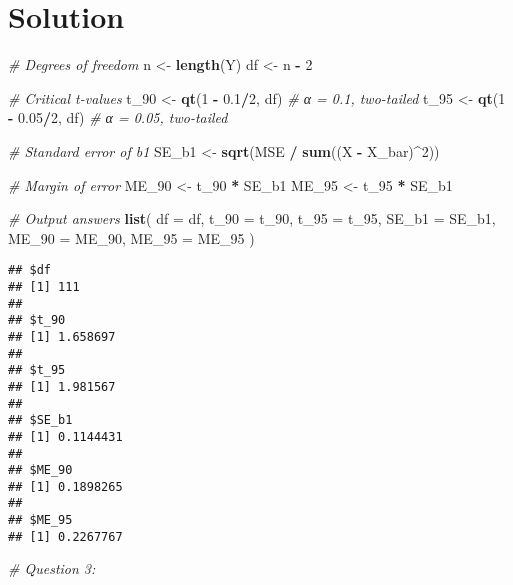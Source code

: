\documentclass[
]{article}
\newenvironment{Shaded}{\begin{snugshade}}{\end{snugshade}}
\newcommand{\AttributeTok}[1]{\textcolor[rgb]{0.13,0.29,0.53}{#1}}
\newcommand{\CommentTok}[1]{\textcolor[rgb]{0.56,0.35,0.01}{\textit{#1}}}
\newcommand{\DecValTok}[1]{\textcolor[rgb]{0.00,0.00,0.81}{#1}}
\newcommand{\FloatTok}[1]{\textcolor[rgb]{0.00,0.00,0.81}{#1}}
\newcommand{\FunctionTok}[1]{\textcolor[rgb]{0.13,0.29,0.53}{\textbf{#1}}}
\newcommand{\NormalTok}[1]{#1}
\newcommand{\OtherTok}[1]{\textcolor[rgb]{0.56,0.35,0.01}{#1}}
\newcommand{\SpecialCharTok}[1]{\textcolor[rgb]{0.81,0.36,0.00}{\textbf{#1}}}
\begin{document}
\section{Solution}\label{solution}

\begin{Shaded}
\begin{Highlighting}[]
\CommentTok{\# Degrees of freedom}
\NormalTok{n }\OtherTok{\textless{}{-}} \FunctionTok{length}\NormalTok{(Y)}
\NormalTok{df }\OtherTok{\textless{}{-}}\NormalTok{ n }\SpecialCharTok{{-}} \DecValTok{2}

\CommentTok{\# Critical t{-}values}
\NormalTok{t\_90 }\OtherTok{\textless{}{-}} \FunctionTok{qt}\NormalTok{(}\DecValTok{1} \SpecialCharTok{{-}} \FloatTok{0.1}\SpecialCharTok{/}\DecValTok{2}\NormalTok{, df)   }\CommentTok{\# α = 0.1, two{-}tailed}
\NormalTok{t\_95 }\OtherTok{\textless{}{-}} \FunctionTok{qt}\NormalTok{(}\DecValTok{1} \SpecialCharTok{{-}} \FloatTok{0.05}\SpecialCharTok{/}\DecValTok{2}\NormalTok{, df)  }\CommentTok{\# α = 0.05, two{-}tailed}

\CommentTok{\# Standard error of b1}
\NormalTok{SE\_b1 }\OtherTok{\textless{}{-}} \FunctionTok{sqrt}\NormalTok{(MSE }\SpecialCharTok{/} \FunctionTok{sum}\NormalTok{((X }\SpecialCharTok{{-}}\NormalTok{ X\_bar)}\SpecialCharTok{\^{}}\DecValTok{2}\NormalTok{))}

\CommentTok{\# Margin of error}
\NormalTok{ME\_90 }\OtherTok{\textless{}{-}}\NormalTok{ t\_90 }\SpecialCharTok{*}\NormalTok{ SE\_b1}
\NormalTok{ME\_95 }\OtherTok{\textless{}{-}}\NormalTok{ t\_95 }\SpecialCharTok{*}\NormalTok{ SE\_b1}

\CommentTok{\# Output answers}
\FunctionTok{list}\NormalTok{(}
  \AttributeTok{df =}\NormalTok{ df,}
  \AttributeTok{t\_90 =}\NormalTok{ t\_90,}
  \AttributeTok{t\_95 =}\NormalTok{ t\_95,}
  \AttributeTok{SE\_b1 =}\NormalTok{ SE\_b1,}
  \AttributeTok{ME\_90 =}\NormalTok{ ME\_90,}
  \AttributeTok{ME\_95 =}\NormalTok{ ME\_95}
\NormalTok{)}
\end{Highlighting}
\end{Shaded}

\begin{verbatim}
## $df
## [1] 111
## 
## $t_90
## [1] 1.658697
## 
## $t_95
## [1] 1.981567
## 
## $SE_b1
## [1] 0.1144431
## 
## $ME_90
## [1] 0.1898265
## 
## $ME_95
## [1] 0.2267767
\end{verbatim}

\begin{Shaded}
\begin{Highlighting}[]
\CommentTok{\# Question 3: }
\end{Highlighting}
\end{Shaded}
\end{document}
